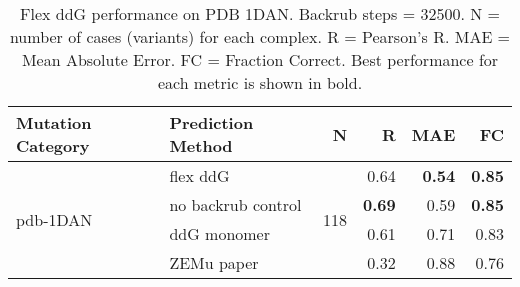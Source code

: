 \begin{table}
  \begin{tabular}{llrrrr}
\toprule
Mutation Category &   Prediction Method &    N &    R &  MAE &   FC \\
\midrule
 \multirow{ 4}{*}{pdb-1DAN} & flex ddG & \multirow{ 4}{*}{118} & 0.64 & \textbf{0.54} & \textbf{0.85}  \\
 & no backrub control & & \textbf{0.69} & 0.59 & \textbf{0.85}  \\
 & ddG monomer & & 0.61 & 0.71 & 0.83  \\
 & ZEMu paper & & 0.32 & 0.88 & 0.76  \\
\bottomrule
\end{tabular}
  \caption[Flex ddG performance on PDB 1DAN]{
    Flex ddG performance on PDB 1DAN. Backrub steps = 32500. N = number of cases (variants) for each complex. R = Pearson's R. MAE = Mean Absolute Error. FC = Fraction Correct. Best performance for each metric is shown in bold.
  } \label{tab:table-pdb-1DAN}
\end{table}
